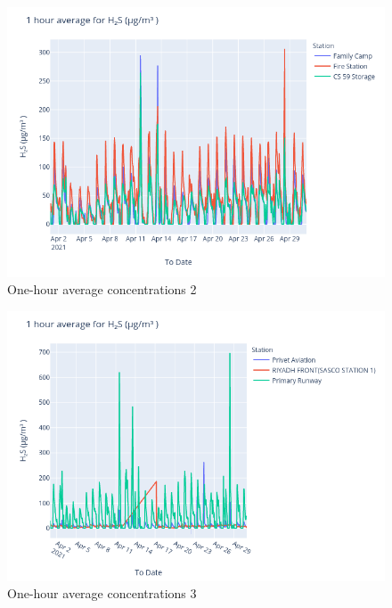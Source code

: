\documentclass[12pt, oneside]{book}
\begin{document}
{\bigskip
{}
{\begin{figure}[H]
\centering
\includegraphics[width=\textwidth]{image201}
\caption{One-hour average  concentrations 2}\label{image201}
\end{figure}}{}


{\begin{figure}[H]
\centering
\includegraphics[width=\textwidth]{image213}
\caption{One-hour average  concentrations 3}\label{image213}
\end{figure}}{}


}
\end{document}

